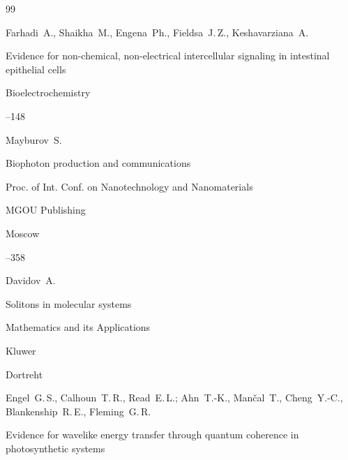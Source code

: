 \begin{thebibliography}{99}

\by Farhadi~A., Shaikha~M.,  Engena~Ph.,  Fieldsa~J.\,Z., Keshavarziana~A.

\paper Evidence for non-chemical, non-electrical intercellular signaling in intestinal epithelial cells

\jour Bio\-electro\-chemistry



--148





\by Mayburov~S. 

\paper Biophoton production and communications 

\inbook Proc. of Int. Conf. on Nano\-tech\-nology and  Nanomaterials

\publ MGOU Publishing

\publaddr Moscow

--358





\by Davidov~A.

\book Solitons in molecular systems

\serial Mathematics and its Applications

\publ Kluwer

\publaddr Dortreht




















\by Engel~G.\,S., Calhoun~T.\,R., Read~E.\,L.; Ahn~T.-K., Man\v{c}al~T., Cheng~Y.-C., Blanken\-ship~R.\,E., Fleming~G.\,R.

\paper Evidence for wavelike energy transfer through quantum coherence in photosynthetic systems


\end{thebibliography}
